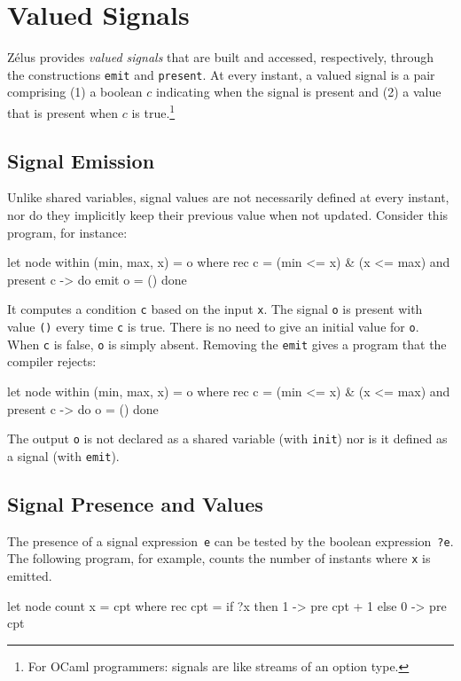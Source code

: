 \documentclass[11pt,titlepage,twoside]{report}
\makeatletter
\newcommand{\zls}[1]{{\@span{class="zelusinline"}#1}}
\newcommand{\zls}[1]{\texttt{#1}}
\renewcommand{\zls}[1]{\texttt{#1}}
\newcommand{\zelus}{{\sf Z\'elus}}
\newcommand{\ocaml}{{\sf OCaml}}
\makeatother
\begin{document}
\section{Valued Signals\label{signals}} %

\zelus{} provides \emph{valued signals} that are built and accessed, 
respectively, through the constructions \zls{emit} and \zls{present}.
At every instant, a valued signal is a pair comprising (1) a boolean
$c$ indicating when the signal is present and (2) a value that is present 
when $c$ is true.\footnote{For \ocaml{} programmers: signals are like 
streams of an option type.}
 
\subsection{Signal Emission\label{emit}} %

Unlike shared variables, signal values are not necessarily defined at every 
instant, nor do they implicitly keep their previous value when not updated.
Consider this program, for instance:
\begin{chklisting}[withresult]
let node within (min, max, x) = o where
  rec c = (min <= x) & (x <= max)
  and present c -> do emit o = () done
\end{chklisting}
It computes a condition \zls{c} based on the input \zls{x}.
The signal \zls{o} is present with value \zls{()} every time \zls{c} is
true.
There is no need to give an initial value for \zls{o}.
When \zls{c} is false, \zls{o} is simply absent.
Removing the \zls{emit} gives a program that the compiler rejects:
\begin{chklisting}
let node within (min, max, x) = o where
  rec c = (min <= x) & (x <= max)
  and present c -> do o = () done
\end{chklisting}
The output \zls{o} is not declared as a shared variable (with \zls{init}) 
nor is it defined as a signal (with \zls{emit}).

\subsection{Signal Presence and Values\label{signalpresence}} %

The presence of a signal expression~\zls{e} can be tested by the boolean 
expression~\zls{?e}.
The following program, for
example, counts the number of instants where \zls{x} is emitted.
\begin{chklisting}[withresult]
let node count x = cpt where
  rec cpt = if ?x then 1 -> pre cpt + 1 else 0 -> pre cpt
\end{chklisting}
\end{document}

